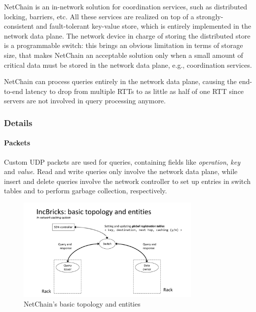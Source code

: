 NetChain \cite{netchain} is an in-network solution for coordination services, such as distributed locking, barriers, etc.
All these services are realized on top of a strongly-consistent and fault-tolerant key-value store, which is entirely implemented in the network data plane.
The network device in charge of storing the distributed store is a programmable switch: this brings an obvious limitation in terms of storage size, that makes NetChain \cite{netchain} an acceptable solution only when a small amount of critical data must be stored in the network data plane, e.g., coordination services.\par
NetChain \cite{netchain} can process queries entirely in the network data plane, causing the end-to-end latency to drop from multiple RTTs to as little as half of one RTT since servers are not involved in query processing anymore.

\subsubsection{Details}
\paragraph{Packets}
Custom UDP packets are used for queries, containing fields like \textit{operation}, \textit{key} and \textit{value}.
Read and write queries only involve the network data plane, while insert and delete queries involve the network controller to set up entries in switch tables and to perform garbage collection, respectively.

\begin{figure}[!htb]
    \centering
        \includegraphics[page=5, clip, trim=3.6cm 0.7cm 10cm 4.15cm, width=0.8\textwidth]{figures/analysis/inp/presentation.pdf}
    \caption{NetChain's \texorpdfstring{\cite{netchain}}{} basic topology and entities}
\end{figure}

